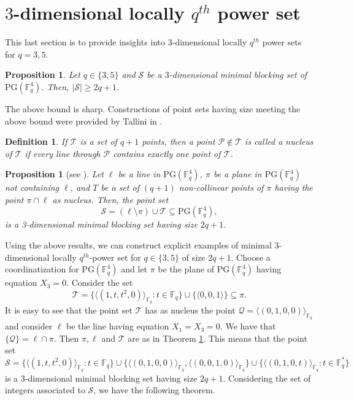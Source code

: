 \documentclass[12pt]{amsart}
\newtheorem{definition}{Definition}
\newtheorem{proposition}[theorem]{Proposition}
\newcommand{\F}{{\mathbb F}}
\newcommand{\fq}{{\mathbb F}_{q}}
\newcommand{\PG}{\mathrm{PG}}
\begin{document}
\section{$3$-dimensional locally $q^{th}$ power set}\label{section:3dim}

This last section is to provide insights into $3$-dimensional locally $q^{th}$ power sets for $q = 3, 5$.
\begin{proposition}
Let $q \in\{3, 5\}$ and $\mathcal{S}$ be a $3$-dimensional minimal blocking set of $\PG(\F_{q}^{4})$. Then, $\lvert \mathcal{S} \rvert \geq 2q+1$.
\end{proposition}

The above bound is sharp. Constructions of point sets having size meeting the above bound were provided by Tallini in \cite{tallini1991blocking}. 
\begin{definition}
If $\mathcal{T}$ is a set of $q + 1$ points, then a point $\mathcal{P} \notin \mathcal{T}$ is called a \emph{nucleus} of $\mathcal{T}$ if every line through $\mathcal{P}$
contains exactly one point of $\mathcal{T}$.
\end{definition}

\begin{proposition} [see \textnormal{\cite[Example 1]{tallini1991blocking}}] \label{prop:blockinglength3}
Let $\ell$ be a line in $\PG(\F_{q}^{4})$, $\pi$ be a plane in $\PG(\F_{q}^{4})$ not containing $\ell$, and $T$ be a set of $(q+1)$ non-collinear points of $\pi$ having the point $\pi \cap \ell$ as nucleus. Then, the point set 
\[
\mathcal{S}=(\ell \setminus \pi) \cup \mathcal{T} \subseteq \PG(\F_{q}^{4}),
\]
is a 3-dimensional minimal blocking set having size $2q+1$.
\end{proposition}

Using the above results, we can construct explicit examples of minimal 3-dimensional locally $q^{th}$-power set for $q \in \{3,5\}$ of size $2q+1$. Choose a coordinatization for $\PG(\F_{q}^{4})$ and let $\pi$ be the plane of $\mathrm{PG}(\F_q^4)$ having equation $X_3=0$. Consider the set 
\[
\mathcal{T}=\{\langle (1,t,t^2,0) \rangle_{\fq} \colon t \in \F_q\} \cup \{ \langle 0,0,1 \rangle\} \subseteq \pi.
\]
It is easy to see that the point set $\mathcal{T}$ has as nucleus the point $\mathcal{Q}=\langle (0,1,0,0) \rangle_{\F_q}$ and consider $\ell$ be the line having equation $X_1=X_3=0$. We have that $\{\mathcal{Q}\}=\ell \cap \pi$. Then $\pi,\ell$ and $\mathcal{T}$ are as in Theorem \ref{prop:blockinglength3}. 
This means that the point set
\[
\mathcal{S}=\{\langle (1,t,t^2,0) \rangle_{\fq} \colon t \in \F_q\} \cup \{\langle (0,1,0,0) \rangle_{\fq},\langle (0,0,1,0) \rangle_{\fq}\} \cup \{\langle  (0,1,0,t)\rangle_{\fq} \colon t \in \F_q^*\}
\]
is a $3$-dimensional minimal blocking set having size $2q+1$. Considering the set of integers associated to $\mathcal{S}$, we have the following theorem.
\end{document}
